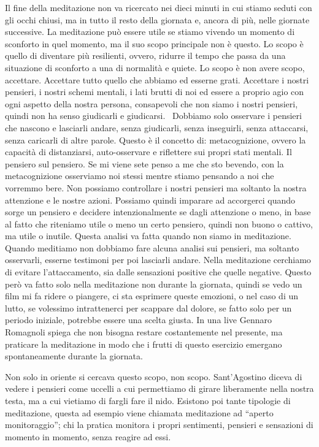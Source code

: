 \documentclass[12pt]{book} %
\begin{document}
Il fine della meditazione non va ricercato nei dieci minuti in cui stiamo seduti con gli occhi chiusi, ma in tutto il
resto della giornata e, ancora di più, nelle giornate successive. La meditazione può essere utile se stiamo vivendo un
momento di sconforto in quel momento, ma il suo scopo principale non è questo. Lo scopo è quello di diventare più
resilienti, ovvero, ridurre il tempo che passa da una situazione di sconforto a una di normalità e quiete. Lo scopo è
non avere scopo, accettare. Accettare tutto quello che abbiamo ed esserne grati. Accettare i nostri pensieri, i nostri
schemi mentali, i lati brutti di noi ed essere a proprio agio con ogni aspetto della nostra persona, consapevoli che
non siamo i nostri pensieri, quindi non ha senso giudicarli e giudicarsi. \ Dobbiamo solo osservare i pensieri che
nascono e lasciarli andare, senza giudicarli, senza inseguirli, senza attaccarsi, senza caricarli di altre parole.
Questo è il concetto di: metacognizione, ovvero la capacità di distanziarsi, auto-osservare e riflettere sui propri
stati mentali. Il pensiero sul pensiero. Se mi viene sete penso a me che sto bevendo, con la metacognizione osserviamo
noi stessi mentre stiamo pensando a noi che vorremmo bere. Non possiamo controllare i nostri pensieri ma soltanto la
nostra attenzione e le nostre azioni. Possiamo quindi imparare ad accorgerci quando sorge un pensiero e decidere
intenzionalmente se dagli attenzione o meno, in base al fatto che riteniamo utile o meno un certo pensiero, quindi non
buono o cattivo, ma utile o inutile. Questa analisi va fatta quando non siamo in meditazione. Quando meditiamo non
dobbiamo fare alcuna analisi sui pensieri, ma soltanto osservarli, esserne testimoni per poi lasciarli andare.
Nella meditazione cerchiamo di evitare l'attaccamento, sia dalle sensazioni positive che quelle negative. Questo però va fatto solo nella meditazione non durante la giornata, quindi se vedo un film mi fa ridere o piangere, ci sta esprimere queste emozioni, o nel caso di un lutto, se volessimo intrattenerci per scappare dal dolore, se fatto solo per un periodo iniziale, potrebbe essere una scelta giusta.
In una live Gennaro Romagnoli spiega che non bisogna restare costantemente nel presente, ma praticare la meditazione in modo che i frutti di questo esercizio emergano spontaneamente durante la giornata.

Non solo in oriente si cercava questo scopo, non scopo. Sant'Agostino diceva di vedere i pensieri come uccelli a cui
permettiamo di girare liberamente nella nostra testa, ma a cui vietiamo di fargli fare il nido. Esistono poi tante
tipologie di meditazione, questa ad esempio viene chiamata meditazione ad “aperto monitoraggio”; chi la pratica
monitora i propri sentimenti, pensieri e sensazioni di momento in momento, senza reagire ad essi. 
\end{document}
